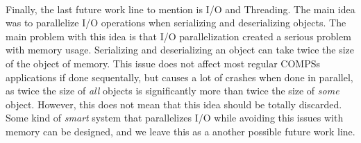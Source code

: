 \\
Finally, the last future work line to mention is I/O and Threading. The main idea was to parallelize I/O operations when serializing and deserializing objects. The main problem with this idea is that I/O parallelization created a serious problem with memory usage. Serializing and deserializing an object can take twice the size of the object of memory. This issue does not affect most regular COMPSs applications if done sequentally, but causes a lot of crashes when done in parallel, as twice the size of \textit{all} objects is significantly more than twice the size of \textit{some} object. However, this does not mean that this idea should be totally discarded. Some kind of \textit{smart} system that parallelizes I/O while avoiding this issues with memory can be designed, and we leave this as a another possible future work line.